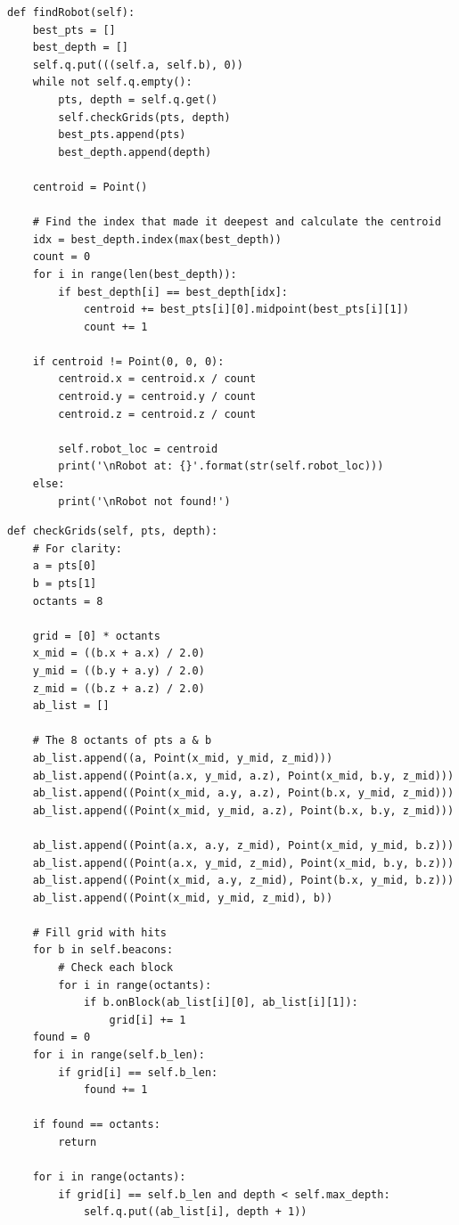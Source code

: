 \documentclass{article}
\begin{document}
\newpage
\begin{verbatim}
def findRobot(self):
    best_pts = []
    best_depth = []
    self.q.put(((self.a, self.b), 0))
    while not self.q.empty():
        pts, depth = self.q.get()
        self.checkGrids(pts, depth)
        best_pts.append(pts)
        best_depth.append(depth)

    centroid = Point()

    # Find the index that made it deepest and calculate the centroid
    idx = best_depth.index(max(best_depth))
    count = 0
    for i in range(len(best_depth)):
        if best_depth[i] == best_depth[idx]:
            centroid += best_pts[i][0].midpoint(best_pts[i][1])
            count += 1

    if centroid != Point(0, 0, 0):
        centroid.x = centroid.x / count
        centroid.y = centroid.y / count
        centroid.z = centroid.z / count

        self.robot_loc = centroid
        print('\nRobot at: {}'.format(str(self.robot_loc)))
    else:
        print('\nRobot not found!')
\end{verbatim}

\newpage
\begin{verbatim}
def checkGrids(self, pts, depth):
    # For clarity:
    a = pts[0]
    b = pts[1]
    octants = 8

    grid = [0] * octants
    x_mid = ((b.x + a.x) / 2.0)
    y_mid = ((b.y + a.y) / 2.0)
    z_mid = ((b.z + a.z) / 2.0)
    ab_list = []

    # The 8 octants of pts a & b
    ab_list.append((a, Point(x_mid, y_mid, z_mid)))
    ab_list.append((Point(a.x, y_mid, a.z), Point(x_mid, b.y, z_mid)))
    ab_list.append((Point(x_mid, a.y, a.z), Point(b.x, y_mid, z_mid)))
    ab_list.append((Point(x_mid, y_mid, a.z), Point(b.x, b.y, z_mid)))

    ab_list.append((Point(a.x, a.y, z_mid), Point(x_mid, y_mid, b.z)))
    ab_list.append((Point(a.x, y_mid, z_mid), Point(x_mid, b.y, b.z)))
    ab_list.append((Point(x_mid, a.y, z_mid), Point(b.x, y_mid, b.z)))
    ab_list.append((Point(x_mid, y_mid, z_mid), b))

    # Fill grid with hits
    for b in self.beacons:
        # Check each block
        for i in range(octants):
            if b.onBlock(ab_list[i][0], ab_list[i][1]):
                grid[i] += 1
    found = 0
    for i in range(self.b_len):
        if grid[i] == self.b_len:
            found += 1

    if found == octants:
        return

    for i in range(octants):
        if grid[i] == self.b_len and depth < self.max_depth:
            self.q.put((ab_list[i], depth + 1))
\end{verbatim}
\end{document}
